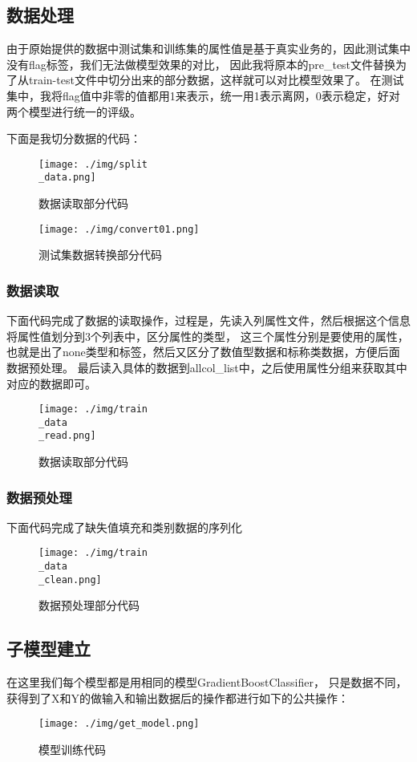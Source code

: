 \documentclass{article}
\begin{document}
\subsection{数据处理}
由于原始提供的数据中测试集和训练集的属性值是基于真实业务的，因此测试集中没有flag标签，我们无法做模型效果的对比，
因此我将原本的pre\_test文件替换为了从train-test文件中切分出来的部分数据，这样就可以对比模型效果了。
在测试集中，我将flag值中非零的值都用1来表示，统一用1表示离网，0表示稳定，好对两个模型进行统一的评级。

下面是我切分数据的代码：
\begin{figure}[H]
	\centering
	\texttt{[image: ./img/split\\\_data.png]}
	\caption{数据读取部分代码}
\end{figure}

\begin{figure}[H]
	\centering
	\texttt{[image: ./img/convert01.png]}
	\caption{测试集数据转换部分代码}
\end{figure}

\subsubsection{数据读取}
下面代码完成了数据的读取操作，过程是，先读入列属性文件，然后根据这个信息将属性值划分到3个列表中，区分属性的类型，
这三个属性分别是要使用的属性，也就是出了none类型和标签，然后又区分了数值型数据和标称类数据，方便后面数据预处理。
最后读入具体的数据到allcol\_list中，之后使用属性分组来获取其中对应的数据即可。
\begin{figure}[H]
	\centering
	\texttt{[image: ./img/train\\\_data\\\_read.png]}
	\caption{数据读取部分代码}
\end{figure}

\subsubsection{数据预处理}
下面代码完成了缺失值填充和类别数据的序列化
\begin{figure}[H]
	\centering
	\texttt{[image: ./img/train\\\_data\\\_clean.png]}
	\caption{数据预处理部分代码}
\end{figure}

\subsection{子模型建立}
在这里我们每个模型都是用相同的模型GradientBoostClassifier，
只是数据不同，获得到了X和Y的做输入和输出数据后的操作都进行如下的公共操作：
\begin{figure}[H]
	\centering
	\texttt{[image: ./img/get\_model.png]}
	\caption{模型训练代码}
\end{figure}
\end{document}
